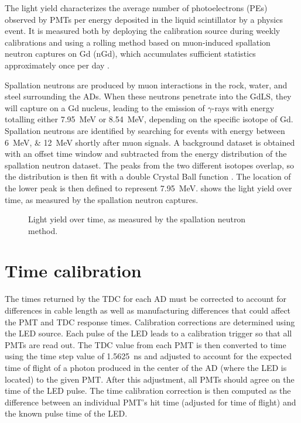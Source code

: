 
The light yield characterizes the average
number of photoelectrons (PEs) observed by PMTs
per energy deposited in the liquid scintillator
by a physics event.
It is measured both by deploying the  calibration source
during weekly calibrations
and using a rolling method based on muon-induced spallation neutron
captures on Gd (nGd), which accumulates sufficient statistics
approximately once per day .

Spallation neutrons are produced by muon interactions in the rock,
water, and steel surrounding the ADs.
When these neutrons penetrate into the GdLS,
they will capture on a Gd nucleus, leading to the emission of $\gamma$-rays
with energy totalling either \SI{7.95}{\MeV} or \SI{8.54}{\MeV},
depending on the specific isotope of Gd.
Spallation neutrons are identified by searching for events
with energy between \SIlist{6;12}{\MeV} shortly after muon signals.
A background dataset is obtained with an offset time window
and subtracted from the energy distribution of the spallation neutron dataset.
The peaks from the two different isotopes overlap,
so the distribution is then fit with a double Crystal Ball function \cite{cbfunction}.
The location of the lower peak is then defined to represent \SI{7.95}{\MeV}.
 shows the light yield over time,
as measured by the spallation neutron captures.

\begin{figure}
    \caption{Light yield over time, as measured by the spallation neutron method.}
    \label{fig:lightyield}
\end{figure}

\section{Time calibration}
\label{sec:time_calib}

The times returned by the TDC for each AD must be corrected
to account for differences in cable length as well as
manufacturing differences that could affect the PMT and TDC response times.
Calibration corrections are determined using the LED source.
Each pulse of the LED leads to a calibration trigger so that all PMTs are read out.
The TDC value from each PMT is then converted to time using the
time step value of \SI{1.5625}{\ns} and adjusted
to account for the expected time of flight
of a photon produced in the center of the AD (where the LED is located)
to the given PMT.
After this adjustment, all PMTs should agree on the time of the LED pulse.
The time calibration correction is then computed
as the difference between an individual PMT's hit time
(adjusted for time of flight)
and the known pulse time of the LED.

